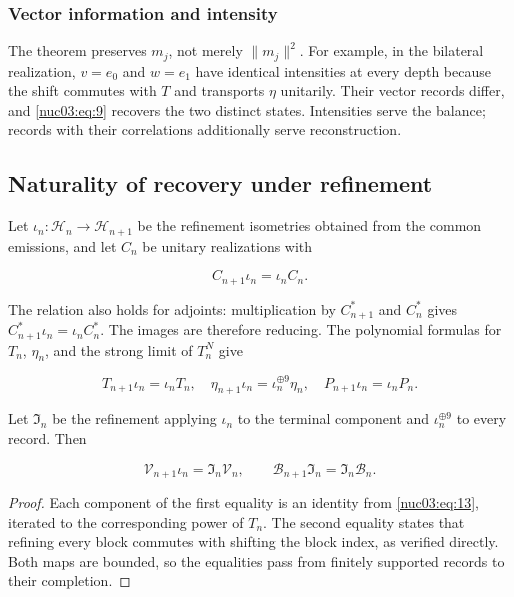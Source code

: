 \subsubsection{Vector information and intensity}

The theorem preserves \(m_j\), not merely \(\|m_j\|^2\). For example, in the bilateral realization, \(v=e_0\) and \(w=e_1\) have identical intensities at every depth because the shift commutes with \(T\) and transports \(\eta\) unitarily. Their vector records differ, and \eqref{nuc03:eq:9} recovers the two distinct states. Intensities serve the balance; records with their correlations additionally serve reconstruction.

\subsection{Naturality of recovery under refinement}

Let \(\iota_n:\mathcal H_n\to\mathcal H_{n+1}\) be the refinement isometries obtained from the common emissions, and let \(C_n\) be unitary realizations with

\begin{equation}
C_{n+1}\iota_n=\iota_nC_n.
\label{nuc03:eq:12}
\end{equation}

The relation also holds for adjoints: multiplication by \(C_{n+1}^*\) and \(C_n^*\) gives \(C_{n+1}^*\iota_n=\iota_nC_n^*\). The images are therefore reducing. The polynomial formulas for \(T_n\), \(\eta_n\), and the strong limit of \(T_n^N\) give

\begin{equation}
T_{n+1}\iota_n=\iota_nT_n,\quad
\eta_{n+1}\iota_n=\iota_n^{\oplus9}\eta_n,\quad
P_{n+1}\iota_n=\iota_nP_n.
\label{nuc03:eq:13}
\end{equation}

Let \(\mathfrak I_n\) be the refinement applying \(\iota_n\) to the terminal component and \(\iota_n^{\oplus9}\) to every record. Then

\begin{equation}
\boxed{\mathcal V_{n+1}\iota_n=\mathfrak I_n\mathcal V_n,\qquad
\mathcal B_{n+1}\mathfrak I_n=\mathfrak I_n\mathcal B_n.}
\label{nuc03:eq:14}
\end{equation}

\begin{proof}
Each component of the first equality is an identity from \eqref{nuc03:eq:13}, iterated to the corresponding power of \(T_n\). The second equality states that refining every block commutes with shifting the block index, as verified directly. Both maps are bounded, so the equalities pass from finitely supported records to their completion.
\end{proof}

